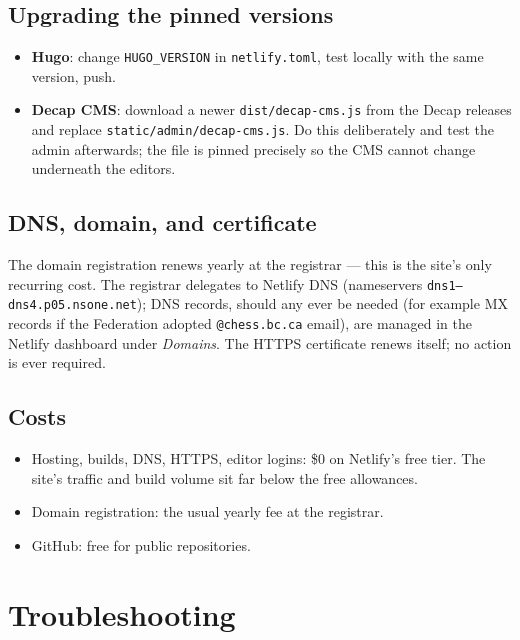 \documentclass[12pt,letterpaper]{article}
\begin{document}
\subsection{Upgrading the pinned versions}

\begin{itemize}
  \item \textbf{Hugo}: change \texttt{HUGO\_VERSION} in
        \texttt{netlify.toml}, test locally with the same version, push.
  \item \textbf{Decap CMS}: download a newer
        \texttt{dist/decap-cms.js} from the Decap releases and replace
        \texttt{static/admin/decap-cms.js}. Do this deliberately and test
        the admin afterwards; the file is pinned precisely so the CMS
        cannot change underneath the editors.
\end{itemize}

\subsection{DNS, domain, and certificate}

The domain registration renews yearly at the registrar --- this is the
site's only recurring cost. The registrar delegates to Netlify DNS
(nameservers \texttt{dns1--dns4.p05.nsone.net}); DNS records, should any
ever be needed (for example MX records if the Federation adopted
\texttt{@chess.bc.ca} email), are managed in the Netlify dashboard under
\emph{Domains}. The HTTPS certificate renews itself; no action is ever
required.

\subsection{Costs}

\begin{itemize}[nosep]
  \item Hosting, builds, DNS, HTTPS, editor logins: \$0 on Netlify's free
        tier. The site's traffic and build volume sit far below the free
        allowances.
  \item Domain registration: the usual yearly fee at the registrar.
  \item GitHub: free for public repositories.
\end{itemize}

\section{Troubleshooting}
\label{sec:trouble}
\end{document}

